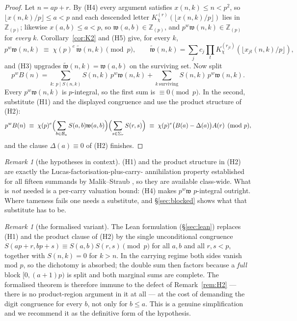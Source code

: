 \documentclass[11pt,reqno]{amsart}
\theoremstyle{plain}
\theoremstyle{definition}
\theoremstyle{remark}
\newtheorem{remark}[theorem]{Remark}
\newcommand{\Z}{\mathbb{Z}}
\newcommand{\Zp}{\Z_{(p)}}
\newcommand{\KK}[3]{K^{(#1)}_{#2}\!\left(#3\right)}
\numberwithin{equation}{section}
\begin{document}
\begin{proof}
Let $n=ap+r$. By (H4) every argument satisfies $x(n,k)\le n<p^2$, so
$\lfloor x(n,k)/p\rfloor\le a<p$ and each descended letter
$\KK{r}{\chi}{\lfloor x(n,k)/p\rfloor}$ lies in $\Zp$; likewise $x(a,b)\le a<p$, so
$\mathfrak w(a,b)\in\Zp$, and $p^w\mathfrak w(n,k)\in\Zp$ for \emph{every} $k$.
Corollary~\ref{cor:K2} and (H5) give, for every $k$,
\[
  p^{w}\mathfrak w(n,k)\;\equiv\;\chi(p)^{e}\,\widetilde{\mathfrak w}(n,k)\pmod p,
  \qquad
  \widetilde{\mathfrak w}(n,k)
   =\sum_jc_j\prod_t\KK{r_{jt}}{\chi}{\lfloor x_{jt}(n,k)/p\rfloor},
\]
and (H3) upgrades $\widetilde{\mathfrak w}(n,k)=\mathfrak w(a,b)$ on the surviving set. Now
split
\[
  p^{w}B(n)=\sum_{k:\,p\mid S(n,k)}S(n,k)\,p^{w}\mathfrak w(n,k)
           +\sum_{k\ \mathrm{surviving}}S(n,k)\,p^{w}\mathfrak w(n,k).
\]
Every $p^{w}\mathfrak w(n,k)$ is $p$-integral, so the first sum is $\equiv0\pmod p$. In the
second, substitute (H1) and the displayed congruence and use the product structure of (H2):
\[
  p^{w}B(n)\;\equiv\;\chi(p)^{e}\Bigl(\sum_{b\in\mathcal B_a}S(a,b)\mathfrak w(a,b)\Bigr)
                     \Bigl(\sum_{s\in\Sigma_r}S(r,s)\Bigr)
   \;\equiv\;\chi(p)^{e}\bigl(B(a)-\Delta(a)\bigr)A(r)\pmod p ,
\]
and the clause $\Delta(a)\equiv0$ of (H2) finishes.
\end{proof}

\begin{remark}[the hypotheses in context]
(H1) and the product structure in (H2) are exactly the Lucas-factorisation-plus-carry-\-
annihilation property established for all fifteen summands by Malik--Straub
\cite{MalikStraub}, so they are available class-wide. What is \emph{not} needed is a
per-carry valuation bound: (H4) makes $p^{w}\mathfrak w$ $p$-integral outright. Where
tameness fails one needs a substitute, and \S\ref{sec:blocked} shows what that substitute
has to be.
\end{remark}

\begin{remark}[the formalised variant]\label{rem:leanH}
The Lean formulation (\S\ref{sec:lean}) replaces (H1) and the product clause of (H2) by the
single unconditional congruence $S(ap+r,bp+s)\equiv S(a,b)S(r,s)\pmod p$ for all $a,b$ and
all $r,s<p$, together with $S(n,k)=0$ for $k>n$. In the carrying regime both sides vanish
mod $p$, so the dichotomy is absorbed; the double sum then factors because a \emph{full}
block $[0,(a+1)p)$ is split and both marginal sums are complete. The formalised theorem is
therefore immune to the defect of Remark~\ref{rem:H2} --- there is no product-region
argument in it at all --- at the cost of demanding the digit congruence for every $b$, not
only for $b\le a$. This is a genuine simplification and we recommend it as the definitive
form of the hypothesis.
\end{remark}
\end{document}
